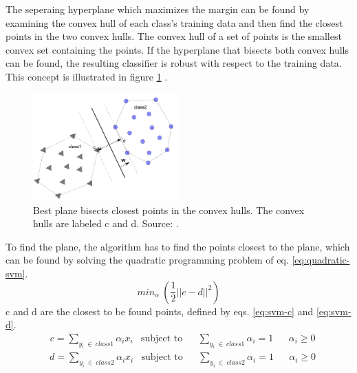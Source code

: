 The seperaing hyperplane which maximizes the margin can be found by examining 
the convex hull of each class’s training data and then find the closest points 
in the two convex hulls. The convex hull of a set of points is the
smallest convex set containing the points. If the hyperplane that bisects both 
convex hulls can be found, the resulting classifier is robust with
respect to the training data.
This concept is illustrated in figure \ref{fig:convex_hull} \citep{convexhull}.
\begin{figure}[h]
\centering
\includegraphics[width = 0.5\textwidth]{img/convex_hull.png}
\caption[Best plane bisects closest points in the convex hulls]
{Best plane bisects closest points in the convex hulls. The convex hulls 
are labeled c and d. Source: \citep{convexhull}.}
\label{fig:convex_hull}
\end{figure}  

To find the plane, the algorithm has to find the points closest
to the plane, which can 
be found by solving the quadratic programming problem of eq. \eqref{eq:quadratic-svm}.
\begin{equation}
min_\alpha~\left(\frac{1}{2} ||c-d||^2\right)
\label{eq:quadratic-svm}
\end{equation}
c and d are the closest to be found points,
defined by eqs. \eqref{eq:svm-c} and \eqref{eq:svm-d}.
\begin{equation}
\begin{aligned}
&c = \sum_{y_i~\in~class1} \alpha_ix_i  
& \text{subject to}
&& \sum_{y_i~\in~class1}\alpha_i =1 
&& \alpha_i \geq 0
\end{aligned}
\label{eq:svm-c} 
\end{equation}
\begin{equation}
\begin{aligned}
&d = \sum_{y_i~\in~class2} \alpha_ix_i  
& \text{subject to}
&& \sum_{y_i~\in~class2}\alpha_i =1 
&& \alpha_i \geq 0
\end{aligned} 
\label{eq:svm-d} 
\end{equation}

